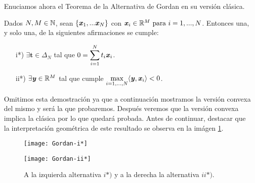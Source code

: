 \bigskip
Enuciamos ahora el Teorema de la Alternativa de Gordan en su versión clásica.
\bigskip
\begin{teoremaBox}\label{GordanClasic}
	Dados $N, M \in \mathbb{N}   $, sean $ \{\textbf{\emph{x}}_1,...\textbf{\emph{x}}_N\}$ con $ \textbf{\emph{x}}_i \in \mathbb{R}^M \text{ para } i=1,...,N$. Entonces una, y solo una, de la siguientes afirmaciones se cumple:
	
	\begin{itemize}
		\item[i*)] $ \exists \mathbf{t} \in \Delta_N $ tal que  $  0 = \displaystyle \sum_{i=1}^{N}{t_i \textbf{\emph{x}}_i}$.
		\item[ii*)] $ \exists \textbf{\emph{y}} \in \mathbb{R}^M $ tal que cumple $ \displaystyle \max_{i=1,...,N} \langle \textbf{\emph{y}}, \textbf{\emph{x}}_i \rangle < 0 $.
	\end{itemize}
\end{teoremaBox}
\bigskip
Omitimos esta demostración ya que a continuación mostramos la versión convexa del mismo y será la que probaremos. Después veremos que la versión convexa  implica la clásica por lo que quedará probada. Antes de continuar, destacar que la interpretación geométrica de este resultado se observa en la imágen \ref{fig:gordan-clasic}.

\begin{figure}[h!]
	\begin{minipage}{0.5\textwidth}
		\centering
		\texttt{[image: Gordan-i*]} 
	\end{minipage}
	\begin{minipage}{0.5\textwidth}
		\texttt{[image: Gordan-ii*]}
	\end{minipage}
	\caption{A la izquierda alternativa $ i*) $ y a la derecha la alternativa $ ii*) $.}
	\label{fig:gordan-clasic}
\end{figure}

